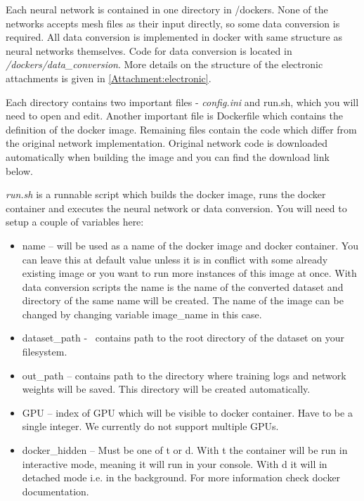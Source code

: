 Each neural network is contained in one directory in /dockers. None of the networks accepts mesh files as their input directly, so some data conversion is required. All data conversion is implemented in docker with same structure as neural networks themselves. Code for data conversion is located in \textit{/dockers/data\_conversion}. More details on the structure of the electronic attachments is given in \autoref{Attachment:electronic}.

Each directory contains two important files - \textit{config.ini} and run.sh, which you will need to open and edit. Another important file is Dockerfile which contains the definition of the docker image. Remaining files contain the code which differ from the original network implementation. Original network code is downloaded automatically when building the image and you can find the download link below.

\textit{run.sh} is a runnable script which builds the docker image, runs the docker container and executes the neural network or data conversion. You will need to setup a couple of variables here:

\begin{itemize}
	\item  {name -- will be used as a name of the docker image and docker container. You can leave this at default value unless it is in conflict with some already existing image or you want to run more instances of this image at once. With data conversion scripts the name is the name of the converted dataset and directory of the same name will be created. The name of the image can be changed by changing variable image\_name in this case.}
	\item{ dataset\_path -  contains path to the root directory of the dataset on your filesystem.}
	\item{out\_path -- contains path to the directory where training logs and network weights will be saved. This directory will be created automatically.}
	\item{ GPU -- index of GPU which will be visible to docker container. Have to be a single integer. We currently do not support multiple GPUs.}
	\item{docker\_hidden -- Must be one of t or d. With t the container will be run in interactive mode, meaning it will run in your console. With d it will in detached mode i.e. in the background. For more information check docker documentation.}
\end{itemize}

